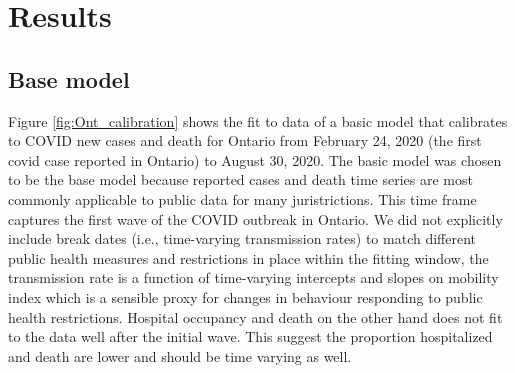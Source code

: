 \documentclass[12pt]{article}\usepackage[]{graphicx}\usepackage[]{color}
\begin{document}

\FloatBarrier

\hypertarget{sec:Results}{}
\section{Results}


\subsection{Base model}

Figure \ref{fig:Ont_calibration} shows the fit to data of a basic model that calibrates to COVID new cases and death for Ontario from February 24, 2020 (the first covid case reported in Ontario) to August 30, 2020. 
The basic model was chosen to be the base model because reported cases and death time series are most commonly applicable to public data for many juristrictions.
This time frame captures the first wave of the COVID outbreak in Ontario. 
We did not explicitly include break dates (i.e., time-varying transmission rates) to match different public health measures and restrictions in place within the fitting window, the transmission rate is a function of time-varying intercepts and slopes on mobility index which is a sensible proxy for changes in behaviour responding to public health restrictions.
Hospital occupancy and death on the other hand does not fit to the data well after the initial wave. This suggest the proportion hospitalized and death are lower and should be time varying as well. 
\end{document}
